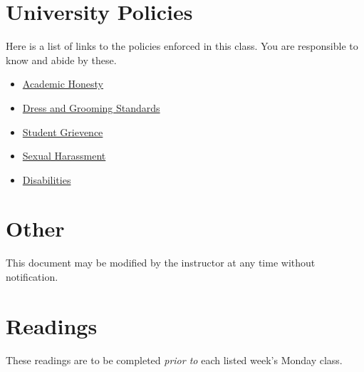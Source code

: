 \documentclass[12pt]{amsart}
\begin{document}
\section{University Policies}
Here is a list of links to the policies enforced in this class. You are responsible to know and abide by these.
\begin{itemize}

\item \href{http://www.byui.edu/catalog/#/policy/HJPtItSal?bc=true&bcCurrent=Academic Honesty&bcGroup=University Standards&bcItemType=policies}{Academic Honesty}
\item \href{http://www.byui.edu/catalog/#/policy/SkaRPKHTl?bc=true&bcCurrent=Dress and Grooming Standards&bcGroup=University Standards&bcItemType=policies}{Dress and Grooming Standards}
\item \href{http://www.byui.edu/catalog/#/policy/SJ8pMAmZr?bc=true&bcCurrent=Student Grievance&bcGroup=Academic Grievance Policy&bcItemType=policies}{Student Grievence}
\item \href{http://www.byui.edu/titleix/faculty-resources}{Sexual Harassment}
\item \href{http://www.byui.edu/disability-services/syllabus-statement}{Disabilities}

\end{itemize}

\section{Other}
This document may be modified by the instructor at any time without notification.
\section{Readings}
These readings are to be completed \textit{prior to} each listed week's Monday class.
\end{document}
